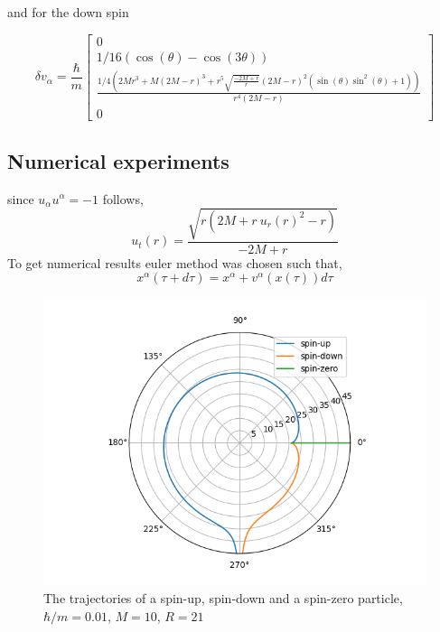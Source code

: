 \documentclass[12pt,a4paper]{article}
\begin{document}
	and for the down spin
	
	$$
	\delta v_\alpha = \frac{\hbar}{m}\left[\begin{matrix}0\\1/16 \left( \cos{\left(\theta\right)} - \cos{\left(3\theta \right)}\right)\\\frac{1/4  \left(2 M r^{3} + M  \left(2 M - r\right)^{3} + r^{5} \sqrt{\frac{- 2 M + r}{r}} \left(2 M - r\right)^{2} \left(\sin{\left(\theta \right)} \sin^{2}{\left(\theta \right)} + 1\right)\right)}{r^{4}  \left(2 M - r\right)}\\0\end{matrix}\right]
	$$
	
	\subsection{Numerical experiments}
	since $u_\alpha u^\alpha = -1$ follows,
	$$
	u_t(r) = \frac{\sqrt{r \left(2 M + r \ {u_{r}(r)}^{2} - r\right)}}{- 2 M + r} 
	$$
	To get numerical results euler method was chosen such that,
		$$
	x^\alpha(\tau + d\tau) = x^\alpha + v^\alpha(x(\tau))d\tau
	$$
	
	\begin{figure}
		\includegraphics[width=\linewidth]{trajectory.png}
		\caption{The trajectories of a spin-up, spin-down and a spin-zero particle, $\hbar /m = 0.01$, $M=10$, $R=21$}
		\label{fig:trajectories}
	\end{figure}
	
	

	
	
	
	
	
	
	
	
	
	
	
	
	
	
	
	
	
	
	
	
	
	
	
	

	

	
	
	
	
	
	
\end{document}
